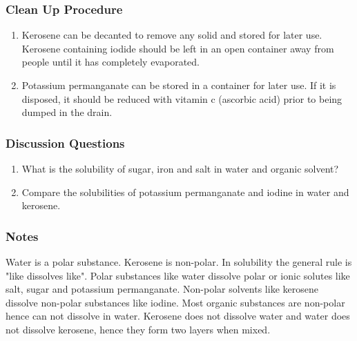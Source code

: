 \subsubsection*{Clean Up Procedure}
\begin{enumerate}
\item{Kerosene can be decanted to remove any solid and stored for later use. Kerosene containing iodide should be left in an open container away from people until it has completely evaporated.}
\item{Potassium permanganate can be stored in a container for later use. If it is disposed, it should be reduced with vitamin c (ascorbic acid) prior to being dumped in the drain.}
\end{enumerate}

\subsubsection*{Discussion Questions}
\begin{enumerate}
\item{What is the solubility of sugar, iron and salt in water and organic solvent?}
\item{Compare the solubilities of potassium permanganate and iodine in water and kerosene.}
\end{enumerate}

\subsubsection*{Notes}
Water is a polar substance. Kerosene is non-polar. In solubility the general rule is "like dissolves like". Polar substances like water dissolve polar or ionic solutes like salt, sugar and potassium permanganate. Non-polar solvents like kerosene dissolve non-polar substances like iodine. Most organic substances are non-polar hence can not dissolve in water. Kerosene does not dissolve water and water does not dissolve kerosene, hence they form two layers when mixed.
